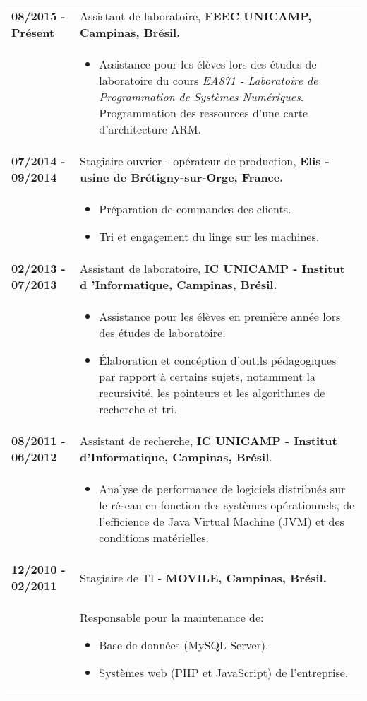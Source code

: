 \documentclass[10pt, a4paper]{article}
\begin{document}
\begin{tabular}{p{} p{}}

\textbf{08/2015 - Présent}  & Assistant de laboratoire, \textbf{FEEC
 UNICAMP, Campinas, Brésil.}
 \\
  &
  \begin{itemize}
    \item Assistance pour les élèves lors des études de
    laboratoire du cours \textit{EA871 - Laboratoire de Programmation de
    Systèmes Numériques}. Programmation des ressources 
    d'une carte d'architecture ARM.
    
	\end{itemize}\\

 \textbf{07/2014 - 09/2014}   & Stagiaire ouvrier - opérateur de  production,
 \textbf{Elis -  usine de Brétigny-sur-Orge, France.}\\
  & \begin{itemize}
    \item Préparation de commandes des clients.
    \item Tri et engagement du linge sur les machines.  
  \end{itemize} \\

 \textbf{02/2013 - 07/2013}   & Assistant de laboratoire, \textbf{IC UNICAMP -
 Institut d 'Informatique, Campinas, Brésil.} \\
  & \begin{itemize}
    \item Assistance pour les élèves en première année lors des études de
    laboratoire.
    \item Élaboration et concéption d'outils pédagogiques par rapport
    à certains sujets, notamment la recursivité, les pointeurs et les
    algorithmes de recherche et  tri.
	\end{itemize}\\

 \textbf{08/2011 - 06/2012} & Assistant de recherche, \textbf{IC UNICAMP -
 Institut d'Informatique, Campinas, Brésil}. \\
 & \begin{itemize}
 	\item Analyse de performance de logiciels distribués sur le réseau  en
 	fonction des systèmes opérationnels, de l’efficience de Java Virtual Machine
 	(JVM) et des conditions matérielles.
 	\end{itemize}
 \\
 
 
 \textbf{12/2010 - 02/2011} & Stagiaire de TI - \textbf{MOVILE, Campinas,
 Brésil.}
 \\  & Responsable pour la maintenance de:
 \begin{itemize}
   \item Base de données (MySQL Server).
   \item Systèmes web (PHP et JavaScript) de l’entreprise.
 \end{itemize} 
\end{tabular}
\end{document}
